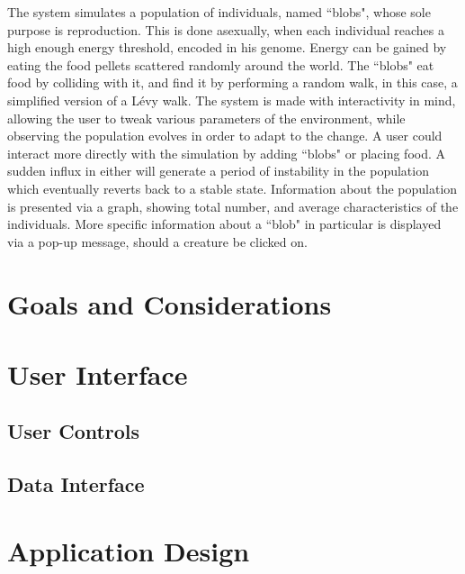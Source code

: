 The system simulates a population of individuals, named ``blobs", whose sole purpose is reproduction. This is done asexually, when each individual reaches a high enough energy threshold, encoded in his genome. Energy can be gained by eating the food pellets scattered randomly around the world. The ``blobs" eat food by colliding with it, and find it by performing a random walk, in this case, a simplified version of a L\'evy walk\cite{matthaus2009coli}.
The system is made with interactivity in mind, allowing the user to tweak various parameters of the environment, while observing the population evolves in order to adapt to the change. A user could interact more directly with the simulation by adding ``blobs" or placing food. A sudden influx in either will generate a period of instability in the population which eventually reverts back to a stable state.
Information about the population is presented via a graph, showing total number, and average characteristics of the individuals. More specific information about a ``blob" in particular is displayed via a pop-up message, should a creature be clicked on.

\section{Goals and Considerations}
\section{User Interface}
\subsection{User Controls}
\subsection{Data Interface}
\section{Application Design}